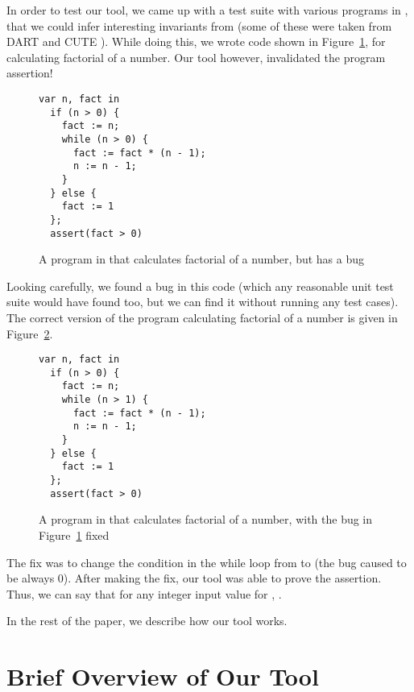 \documentclass[10pt, conference, compsocconf]{IEEEtran}
\begin{document}
In order to test our tool, we came up with a test suite with various programs in \lang, that we could infer interesting invariants from (some of these were taken from DART \cite{Godefroid2005} and CUTE \cite{Sen2005}).
While doing this, we wrote code shown in Figure~\ref{fig:fact-wrong}, for calculating factorial of a number.
Our tool however, invalidated the program assertion! 
\begin{figure}
\begin{verbatim}
var n, fact in
  if (n > 0) {
    fact := n;
    while (n > 0) {
      fact := fact * (n - 1);
      n := n - 1;
    }
  } else {
    fact := 1
  };  
  assert(fact > 0)   
\end{verbatim}
\caption{A program in \lang that calculates factorial of a number, but has a bug}
\label{fig:fact-wrong}
\end{figure}

Looking carefully, we found a bug in this code (which any reasonable unit test suite would have found too, but we can find it without running any test cases).
The correct version of the program calculating factorial of a number is given in Figure~\ref{fig:fact-correct}.
\begin{figure}
\begin{verbatim}
var n, fact in
  if (n > 0) {
    fact := n;
    while (n > 1) {
      fact := fact * (n - 1);
      n := n - 1;
    }
  } else {
    fact := 1
  };  
  assert(fact > 0)   
\end{verbatim}
\caption{A program in \lang that calculates factorial of a number, with the bug in Figure~\ref{fig:fact-wrong} fixed}
\label{fig:fact-correct}
\end{figure}
The fix was to change the condition in the while loop from  to  (the bug caused  to be always 0).
After making the fix, our tool was able to prove the assertion.
Thus, we can say that for any integer input value for , .

In the rest of the paper, we describe how our tool works.

\section{Brief Overview of Our Tool}
\end{document}
